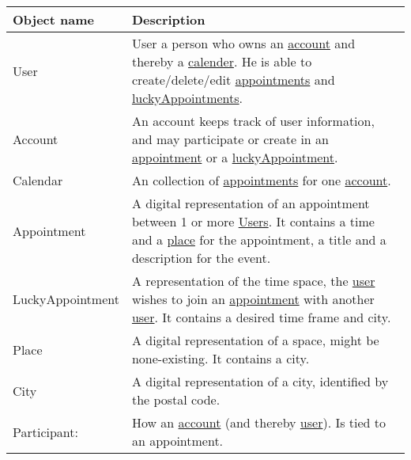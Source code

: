 {\tabulinesep=1.2mm
\begin{tabu}{ | p{3cm} | p{13cm} |}\hline
    Object name 			& 		Description\\\hline
    User  					& 		User a person who owns an \uline{account} and thereby a \uline{calender}. He is able to create/delete/edit \uline{appointments} and  \uline{luckyAppointments}. \\\hline
    Account 				& 		An account keeps track of user information, and may participate or create in an \uline{appointment} or a \uline{luckyAppointment}. \\\hline
	Calendar				&		An collection of \uline{appointments} for one \uline{account}.\\ \hline
	Appointment				&		A digital representation of an appointment between 1 or more \uline{Users}. It contains a time and a \uline{place} for the appointment, a title and a description for the event.\\\hline
	LuckyAppointment		&		A representation of the time space, the \uline{user} wishes to join an \uline{appointment} with another \uline{user}. It contains a desired time frame and city.\\\hline
    Place 					& 		A digital representation of a space, might be none-existing. It contains a city.\\\hline
    City 					& 		A digital representation of a city, identified by the postal code.\\\hline
	Participant: 			&		How an \uline{account} (and thereby \uline{user}). Is tied to an appointment.\\\hline
\end{tabu}
}